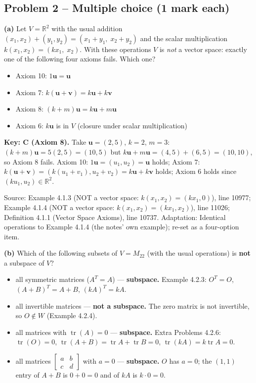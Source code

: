 \documentclass[11pt,a4paper]{article}
\newcommand{\Src}[1]{{\footnotesize\color{black!65}Source: #1}}
\begin{document}
\subsection*{Problem 2 -- Multiple choice (1 mark each)}
\textbf{(a)} Let $V=\mathbb{R}^2$ with the usual addition $(x_1,x_2)+(y_1,y_2)=(x_1+y_1,\;x_2+y_2)$ and the scalar multiplication $k(x_1,x_2)=(kx_1,\;x_2)$. With these operations $V$ is \emph{not} a vector space: exactly one of the following four axioms fails. Which one?\par
\begin{itemize}[leftmargin=8mm,itemsep=0pt]\item[A] Axiom 10: $1\mathbf{u}=\mathbf{u}$\item[B] Axiom 7: $k(\mathbf{u}+\mathbf{v})=k\mathbf{u}+k\mathbf{v}$\item[C$^{\ast}$] Axiom 8: $(k+m)\mathbf{u}=k\mathbf{u}+m\mathbf{u}$\item[D] Axiom 6: $k\mathbf{u}$ is in $V$ (closure under scalar multiplication)\end{itemize}
\textbf{Key: C (Axiom 8).} Take $\mathbf{u}=(2,5)$, $k=2$, $m=3$: $(k+m)\mathbf{u}=5(2,5)=(10,5)$ but $k\mathbf{u}+m\mathbf{u}=(4,5)+(6,5)=(10,10)$, so Axiom 8 fails. Axiom 10: $1\mathbf{u}=(u_1,u_2)=\mathbf{u}$ holds; Axiom 7: $k(\mathbf{u}+\mathbf{v})=(k(u_1+v_1),u_2+v_2)=k\mathbf{u}+k\mathbf{v}$ holds; Axiom 6 holds since $(ku_1,u_2)\in\mathbb{R}^2$.\par
\Src{Example 4.1.3 (NOT a vector space: $k(x_1,x_2)=(kx_1,0)$), line 10977; Example 4.1.4 (NOT a vector space: $k(x_1,x_2)=(kx_1,x_2)$), line 11026; Definition 4.1.1 (Vector Space Axioms), line 10737. Adaptation: Identical operations to Example 4.1.4 (the notes' own example); re-set as a four-option item.}\par
\textbf{(b)} Which of the following subsets of $V=M_{22}$ (with the usual operations) is \textbf{not} a subspace of $V$?\par
\begin{itemize}[leftmargin=8mm,itemsep=0pt]\item[A] all symmetric matrices ($A^T=A$) --- \textbf{subspace.} Example 4.2.3: $O^T=O$, $(A+B)^T=A+B$, $(kA)^T=kA$.\item[B$^{\ast}$] all invertible matrices --- \textbf{not a subspace.} The zero matrix is not invertible, so $O\notin W$ (Example 4.2.4).\item[C] all matrices with $\operatorname{tr}(A)=0$ --- \textbf{subspace.} Extra Problems 4.2.6: $\operatorname{tr}(O)=0$, $\operatorname{tr}(A+B)=\operatorname{tr}A+\operatorname{tr}B=0$, $\operatorname{tr}(kA)=k\operatorname{tr}A=0$.\item[D] all matrices $\begin{bmatrix}a&b\\ c&d\end{bmatrix}$ with $a=0$ --- \textbf{subspace.} $O$ has $a=0$; the $(1,1)$ entry of $A+B$ is $0+0=0$ and of $kA$ is $k\cdot0=0$.\end{itemize}
\end{document}

